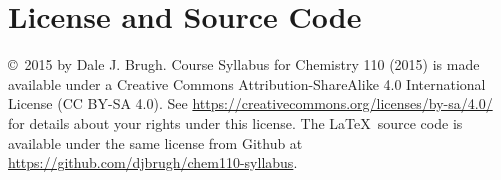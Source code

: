 \documentclass[letterpaper,oneside,onecolumn,11pt,article]{memoir}
\begin{document}
\section{License and Source Code}
\copyright\ 2015 by Dale J. Brugh. Course Syllabus for Chemistry 110 (2015) is made available under a Creative Commons Attribution-ShareAlike 4.0 International License (CC BY-SA 4.0). See \href{https://creativecommons.org/licenses/by-sa/4.0/}{https://creativecommons.org/licenses/by-sa/4.0/} for details about your rights under this license. The \LaTeX\ source code is available under the same license from Github at \href{https://github.com/djbrugh/chem110-syllabus}{https://github.com/djbrugh/chem110-syllabus}. 
%
%
\end{document}
